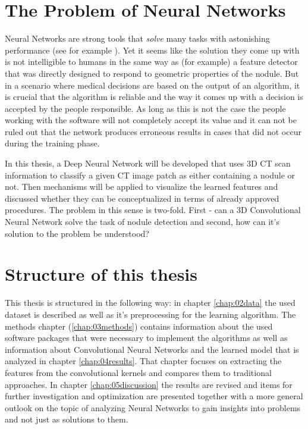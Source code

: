 \documentclass[main.tex]{subfiles}
\begin{document}
\section{The Problem of Neural Networks}
Neural Networks are strong tools that \emph{solve} many tasks with astonishing performance (see for example \cite{silver2017alphagozero}). Yet it seems like the solution they come up with is not intelligible to humans in the same way as (for example) a feature detector that was directly designed to respond to geometric properties of the nodule. But in a scenario where medical decisions are based on the output of an algorithm, it is crucial that the algorithm is reliable and the way it comes up with a decision is accepted by the people responsible. As long as this is not the case the people working with the software will not completely accept its value and it can not be ruled out that the network produces erroneous results in cases that did not occur during the training phase.

In this thesis, a Deep Neural Network will be developed that uses 3D CT scan information to classify a given CT image patch as either containing a nodule or not. Then mechanisms will be applied to visualize the learned features and discussed whether they can be conceptualized in terms of already approved procedures. The problem in this sense is two-fold. First - can a 3D Convolutional Neural Network solve the task of nodule detection and second, how can it's solution to the problem be understood? 


\section{Structure of this thesis}
This thesis is structured in the following way: in chapter \ref{chap:02data} the used dataset is described as well as it's preprocessing for the learning algorithm. The methods chapter (\ref{chap:03methods}) contains information about the used software packages that were necessary to implement the algorithms as well as information about Convolutional Neural Networks and the learned model that is analyzed in chapter \ref{chap:04results}. That chapter focuses on extracting the features from the convolutional kernels and compares them to traditional approaches. In chapter \ref{chap:05discussion} the results are revised and items for further investigation and optimization are presented together with a more general outlook on the topic of analyzing Neural Networks to gain insights into problems and not just as solutions to them. 
\end{document}
